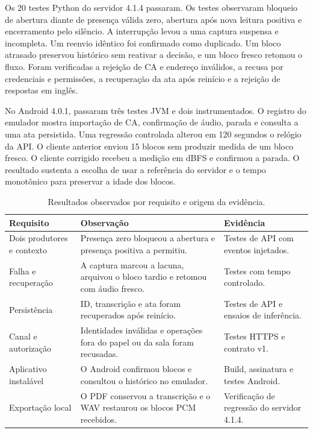 \documentclass[12pt]{article}
\begin{document}
Os 20 testes Python do servidor 4.1.4 passaram. Os testes observaram bloqueio de abertura diante de presença válida zero, abertura após nova leitura positiva e encerramento pelo silêncio. A interrupção levou a uma captura suspensa e incompleta. Um reenvio idêntico foi confirmado como duplicado. Um bloco atrasado preservou histórico sem reativar a decisão, e um bloco fresco retomou o fluxo. Foram verificadas a rejeição de CA e endereço inválidos, a recusa por credenciais e permissões, a recuperação da ata após reinício e a rejeição de respostas em inglês.

No Android 4.0.1, passaram três testes JVM e dois instrumentados. O registro do emulador mostra importação de CA, confirmação de áudio, parada e consulta a uma ata persistida. Uma regressão controlada alterou em 120 segundos o relógio da API. O cliente anterior enviou 15 blocos sem produzir medida de um bloco fresco. O cliente corrigido recebeu a medição em dBFS e confirmou a parada. O resultado sustenta a escolha de usar a referência do servidor e o tempo monotônico para preservar a idade dos blocos.

\begin{table}[H]
\centering
\caption{Resultados observados por requisito e origem da evidência.}
\label{tab:resultados}
\small
\begin{tabularx}{\linewidth}{@{}P{2.85cm}L P{3.55cm}@{}}
\toprule
\textbf{Requisito} & \textbf{Observação} & \textbf{Evidência} \\ \midrule
Dois produtores e contexto & Presença zero bloqueou a abertura e presença positiva a permitiu. & Testes de API com eventos injetados. \\
Falha e recuperação & A captura marcou a lacuna, arquivou o bloco tardio e retomou com áudio fresco. & Testes com tempo controlado. \\
Persistência & ID, transcrição e ata foram recuperados após reinício. & Testes de API e ensaios de inferência. \\
Canal e autorização & Identidades inválidas e operações fora do papel ou da sala foram recusadas. & Testes HTTPS e contrato v1. \\
Aplicativo instalável & O Android confirmou blocos e consultou o histórico no emulador. & Build, assinatura e testes Android. \\
Exportação local & O PDF conservou a transcrição e o WAV restaurou os blocos PCM recebidos. & Verificação de regressão do servidor 4.1.4. \\
\bottomrule
\end{tabularx}
\end{table}
\end{document}
